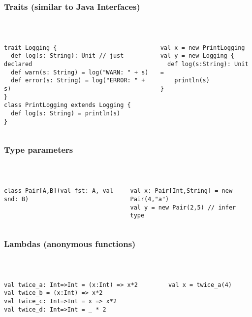 \documentclass[aspectratio=169]{beamer}
\begin{document}
\begin{frame}[fragile]\frametitle{Traits (similar to Java Interfaces)}    
~\\[-8mm]
\begin{columns}
\begin{column}{0.58\textwidth}
\begin{lstlisting}
trait Logging {
  def log(s: String): Unit // just declared
  def warn(s: String) = log("WARN: " + s)
  def error(s: String) = log("ERROR: " + s)
}
class PrintLogging extends Logging {
  def log(s: String) = println(s)
}
\end{lstlisting}
\end{column}
\begin{column}{0.40\textwidth}
\begin{lstlisting}
val x = new PrintLogging
val y = new Logging {
  def log(s:String): Unit =
    println(s)
}
\end{lstlisting}%
\end{column}
\end{columns}
\end{frame}


\begin{frame}[fragile]\frametitle{Type parameters}    
~\\[-8mm]
\begin{columns}
\begin{column}{0.58\textwidth}
\begin{lstlisting}
class Pair[A,B](val fst: A, val snd: B)
\end{lstlisting}
\end{column}
\begin{column}{0.40\textwidth}
\begin{lstlisting}
val x: Pair[Int,String] = new Pair(4,"a")
val y = new Pair(2,5) // infer type
\end{lstlisting}%
\end{column}
\end{columns}
\end{frame}


\begin{frame}[fragile]\frametitle{Lambdas (anonymous functions)}    
~\\[-8mm]
\begin{columns}
\begin{column}{0.58\textwidth}
\begin{lstlisting}
val twice_a: Int=>Int = (x:Int) => x*2
val twice_b = (x:Int) => x*2
val twice_c: Int=>Int = x => x*2
val twice_d: Int=>Int = _ * 2
\end{lstlisting}
\end{column}
\begin{column}{0.40\textwidth}
\begin{lstlisting}
val x = twice_a(4)
\end{lstlisting}%
\end{column}
\end{columns}
\end{frame}
\end{document}
